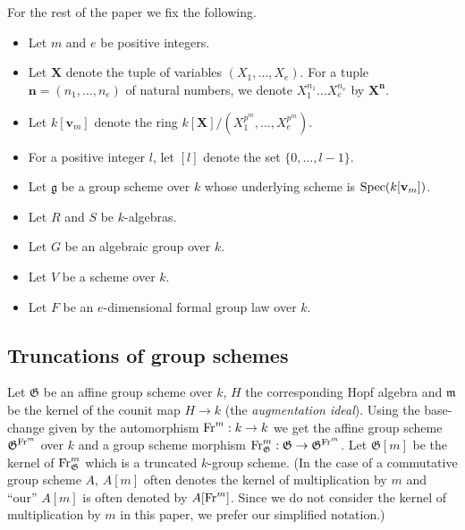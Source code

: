\documentclass[10pt]{amsart}
\theoremstyle{definition}
\begin{document}
\\
\\
For the rest of the paper we fix the following.
\begin{itemize}
\item Let $m$ and $e$ be positive integers.

\item Let $\mathbf{X}$ denote the tuple of variables $(X_1,\ldots,X_e)$. For a tuple $\mathbf{n}=(n_1,\ldots,n_e)$ of natural numbers, we denote $X_1^{n_1}\ldots X_e^{n_e}$ by $\mathbf{X}^{\mathbf{n}}$.

\item Let $k[\mathbf{v}_m]$ denote the ring $k[\mathbf{X}]/(X_1^{p^m},\ldots,X_e^{p^m})$.

\item For a positive integer $l$, let $[l]$ denote the set $\{0,\ldots,l-1\}$.

\item Let $\mathfrak{g}$ be a group scheme over $k$ whose underlying scheme is $\operatorname{Spec}(k[\mathbf{v}_m])$.

\item Let $R$ and $S$ be $k$-algebras.

\item Let $G$ be an algebraic group over $k$.

\item Let $V$ be a scheme over $k$.

\item Let $F$ be an $e$-dimensional formal group law over $k$.
\end{itemize}

\subsection{Truncations of group schemes}\label{gpschemetrun}
Let $\mathfrak{G}$ be an affine group scheme over $k$, $H$ the corresponding Hopf algebra and $\mathfrak{m}$ be the kernel of the counit map $H\to k$ (the \emph{augmentation ideal}). Using the base-change given by the automorphism $\operatorname{Fr}^m:k\to k$ we get the affine group scheme $\mathfrak{G}^{\operatorname{Fr}^m}$ over $k$ and a group scheme
morphism $\operatorname{Fr}^m_{\mathfrak{G}}:\mathfrak{G}\to \mathfrak{G}^{\operatorname{Fr}^m}$. Let $\mathfrak{G}[m]$ be the kernel of $\operatorname{Fr}^m_{\mathfrak{G}}$ which is a truncated $k$-group scheme. (In the case of a commutative group scheme $A$, $A[m]$ often denotes the kernel of multiplication by $m$ and ``our'' $A[m]$ is often denoted by $A[\operatorname{Fr}^m]$. Since we do not consider the kernel of multiplication by $m$ in this paper, we prefer our simplified notation.)
\end{document}
